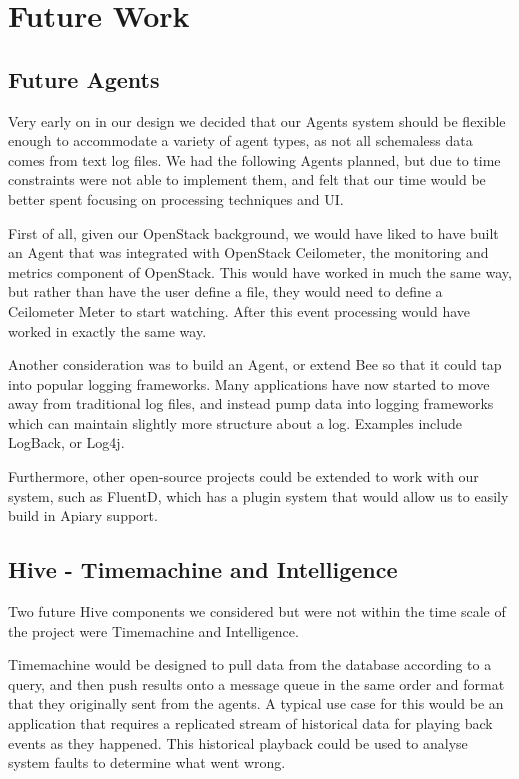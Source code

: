 \section{Future Work}

\subsection{Future Agents}

Very early on in our design we decided that our Agents system should be flexible
enough to accommodate a variety of agent types, as not all schemaless data comes
from text log files. We had the following Agents planned, but due to time
constraints were not able to implement them, and felt that our time would be
better spent focusing on processing techniques and UI.

First of all, given our OpenStack background, we would have liked to have built
an Agent that was integrated with OpenStack Ceilometer\cite{ceilometer}, the monitoring and
metrics component of OpenStack. This would have worked in much the same way, but
rather than have the user define a file, they would need to define a Ceilometer
Meter to start watching. After this event processing would have worked in
exactly the same way.

Another consideration was to build an Agent, or extend Bee so that it could tap
into popular logging frameworks. Many applications have now started to move away
from traditional log files, and instead pump data into logging frameworks which
can maintain slightly more structure about a log. Examples include
LogBack\cite{logback}, or Log4j\cite{log4j}.

Furthermore, other open-source projects could be extended to work with our
system, such as FluentD\cite{fluentd}, which has a plugin system that would allow us to
easily build in Apiary support.


\subsection{Hive - Timemachine and Intelligence}

Two future Hive components we considered but were not within the time scale of
the project were Timemachine and Intelligence.

Timemachine would be designed to pull data from the database according to a
query, and then push results onto a message queue in the same order and format
that they originally sent from the agents. A typical use case for this would be
an application that requires a replicated stream of historical data for playing
back events as they happened. This historical playback could be used to analyse
system faults to determine what went wrong.

